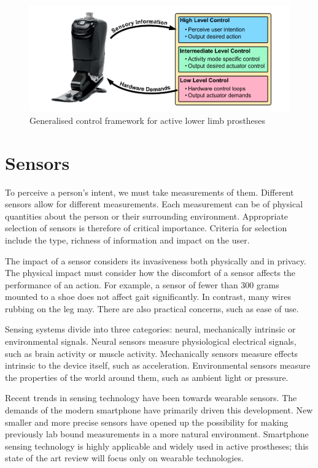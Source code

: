 \begin{figure}[!hbt]
\centering
  \includegraphics[width=\textwidth]{content/2-Background/control_hierarchy.pdf}
  \caption{Generalised control framework for active lower limb prostheses}
  \label{Fig:lit-rev-controller_framework}
\end{figure}


\section{Sensors}
\label{sec:background-sensors}
To perceive a person's intent, we must take measurements of them\cite{Asif2021, Hernandez2021}. Different sensors allow for different measurements. Each measurement can be of physical quantities about the person or their surrounding environment. Appropriate selection of sensors is therefore of critical importance. Criteria for selection include the type, richness of information and impact on the user.\cite{Tucker2015}

The impact of a sensor considers its invasiveness both physically and in privacy. The physical impact must consider how the discomfort of a sensor affects the performance of an action. For example, a sensor of fewer than 300 grams mounted to a shoe does not affect gait significantly\cite{AbdulRazak2012}. In contrast, many wires rubbing on the leg may. There are also practical concerns, such as ease of use.

Sensing systems divide into three categories: neural, mechanically intrinsic or environmental signals. Neural sensors measure physiological electrical signals, such as brain activity or muscle activity. Mechanically sensors measure effects intrinsic to the device itself, such as acceleration. Environmental sensors measure the properties of the world around them, such as ambient light or pressure.\cite{Koller2018, Tucker2015}

Recent trends in sensing technology have been towards wearable sensors. The demands of the modern smartphone have primarily driven this development. New smaller and more precise sensors have opened up the possibility for making previously lab bound measurements in a more natural environment. Smartphone sensing technology is highly applicable and widely used in active prostheses\cite{Asif2021}; this state of the art review will focus only on wearable technologies.

